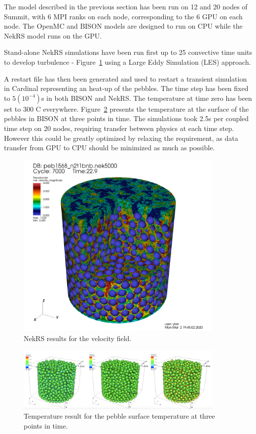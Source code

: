 The model described in the previous section has been run on 12 and 20 nodes of Summit, with 6 MPI ranks on each node, corresponding to the 6 GPU on each node. The OpenMC and BISON models are designed to run on CPU while the NekRS model runs on the GPU.

Stand-alone NekRS simulations have been run first up to 25 convective time units to develop turbulence - Figure~\ref{f:ndemo3} using a Large Eddy Simulation (LES) approach.

 A restart file has then been generated and used to restart a transient simulation in Cardinal representing an heat-up of the pebbles. The time step has been fixed to $5(10^{-4})$s in both BISON and NekRS. The temperature at time zero has been set to 300 C everywhere. Figure~\ref{f:ndemo4} presents the temperature at the surface of the pebbles in BISON at three points in time. The simulations took 2.5s per coupled time step on 20 nodes, requiring transfer between physics at each time step. However this could be greatly optimized by relaxing the requirement, as data transfer from GPU to CPU should be minimized as much as possible.

\begin{figure}[!h]
\centering
\includegraphics[clip=true,width=0.9\textwidth]{Figures/ndemo_r3}
\caption{NekRS results for the velocity field.}
\label{f:ndemo3}
\end{figure}


\begin{figure}[!h]
\centering
\includegraphics[clip=true,width=0.9\textwidth]{Figures/ndemo_r4}
\caption{Temperature result for the pebble surface temperature at three points in time.}
\label{f:ndemo4}
\end{figure}

